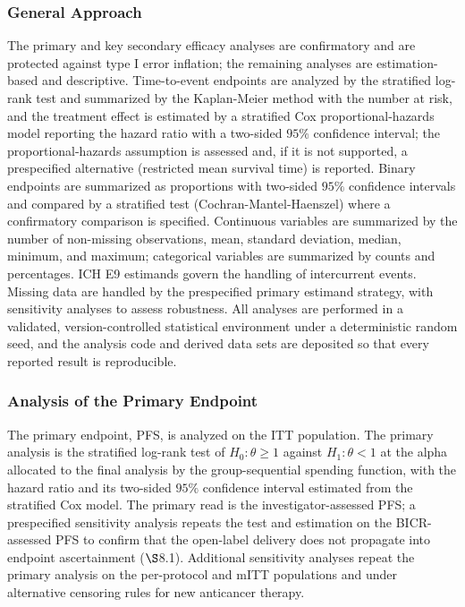 \subsubsection{General Approach}

The primary and key secondary efficacy analyses are confirmatory and are protected
against type I error inflation; the remaining analyses are estimation-based and
descriptive. Time-to-event endpoints are analyzed by the stratified log-rank test and
summarized by the Kaplan-Meier method with the number at risk, and the treatment
effect is estimated by a stratified Cox proportional-hazards model reporting the
hazard ratio with a two-sided $95\%$ confidence interval; the proportional-hazards
assumption is assessed and, if it is not supported, a prespecified alternative
(restricted mean survival time) is reported. Binary endpoints are summarized as
proportions with two-sided $95\%$ confidence intervals and compared by a
stratified test (Cochran-Mantel-Haenszel) where a confirmatory comparison is
specified. Continuous variables are summarized by the number of non-missing
observations, mean, standard deviation, median, minimum, and maximum; categorical
variables are summarized by counts and percentages. ICH E9 estimands govern the
handling of intercurrent events. Missing data are handled by the prespecified primary
estimand strategy, with sensitivity analyses to assess robustness. All analyses are
performed in a validated, version-controlled statistical environment under a
deterministic random seed, and the analysis code and derived data sets are deposited
so that every reported result is reproducible.

\subsubsection{Analysis of the Primary Endpoint}

The primary endpoint, PFS, is analyzed on the ITT population. The primary analysis is
the stratified log-rank test of $H_0\!: \theta \geq 1$ against $H_1\!: \theta < 1$ at
the alpha allocated to the final analysis by the group-sequential spending function,
with the hazard ratio and its two-sided $95\%$ confidence interval estimated from the
stratified Cox model. The primary read is the investigator-assessed PFS; a
prespecified sensitivity analysis repeats the test and estimation on the
BICR-assessed PFS to confirm that the open-label delivery does not propagate into
endpoint ascertainment ($\S$8.1). Additional sensitivity analyses repeat the primary
analysis on the per-protocol and mITT populations and under alternative
censoring rules for new anticancer therapy.

